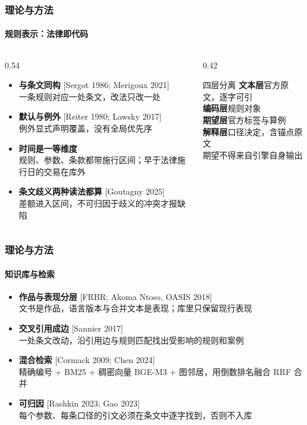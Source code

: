 \documentclass[english, sectionpage=false]{tumbeamer}
\newcommand{\subnote}[1]{{\footnotesize\color{TUMGrayDark} #1}}
\newcommand{\src}[1]{{\scriptsize\color{TUMGray}[#1]}}
\begin{document}
\begin{frame}
  \frametitle{理论与方法}
  \framesubtitle{规则表示：法律即代码}
  \begin{columns}[T]
    \begin{column}{0.54\textwidth}
      \begin{itemize}
        \item \textbf{与条文同构} \src{Sergot 1986; Merigoux 2021}\\
          \subnote{一条规则对应一处条文，改法只改一处}
        \item \textbf{默认与例外} \src{Reiter 1980; Lawsky 2017}\\
          \subnote{例外显式声明覆盖，没有全局优先序}
        \item \textbf{时间是一等维度}\\
          \subnote{规则、参数、条款都带施行区间；早于法律施行日的交易在库外}
        \item \textbf{条文歧义两种读法都算} \src{Goutagny 2025}\\
          \subnote{差额进入区间，不可归因于歧义的冲突才报缺陷}
      \end{itemize}
    \end{column}
    \begin{column}{0.42\textwidth}
      \begin{TUMBox}[TUMOrange]{四层分离}
        \textbf{文本层}\quad 官方原文，逐字可引\\[0.25em]
        \textbf{编码层}\quad 规则对象\\[0.25em]
        \textbf{期望层}\quad 官方标签与算例\\[0.25em]
        \textbf{解释层}\quad 口径决定，含锚点原文\\
        \subnote{期望不得来自引擎自身输出}
      \end{TUMBox}
    \end{column}
  \end{columns}
\end{frame}

\begin{frame}
  \frametitle{理论与方法}
  \framesubtitle{知识库与检索}
  \begin{itemize}
    \item \textbf{作品与表现分层} \src{FRBR; Akoma Ntoso, OASIS 2018}\\
      \subnote{文书是作品，语言版本与合并文本是表现；库里只保留现行表现}
    \item \textbf{交叉引用成边} \src{Sannier 2017}\\
      \subnote{一处条文改动，沿引用边与规则匹配找出受影响的规则和案例}
    \item \textbf{混合检索} \src{Cormack 2009; Chen 2024}\\
      \subnote{精确编号 + BM25 + 稠密向量 BGE-M3 + 图邻居，用倒数排名融合 RRF 合并}
    \item \textbf{可归因} \src{Rashkin 2023; Gao 2023}\\
      \subnote{每个参数、每条口径的引文必须在条文中逐字找到，否则不入库}
  \end{itemize}
\end{frame}
\end{document}

